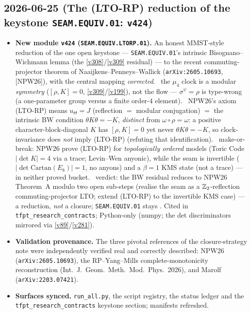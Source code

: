 \subsection*{2026-06-25 (The (LTO-RP) reduction of the keystone \texttt{SEAM.EQUIV.01}: \texttt{v424})}
\begin{itemize}
\item \textbf{New module \texttt{v424} (\texttt{SEAM.EQUIV.LTORP.01}).} An honest MMST-style reduction of the one
open keystone --- \texttt{SEAM.EQUIV.01}'s intrinsic Bisognano--Wichmann lemma (the \vref{v308}/\vref{v309}
residual) --- to the recent commuting-projector theorem of Naaijkens--Penneys--Wallick (\texttt{arXiv:2605.10693},
[NPW26]), with the central mapping \emph{corrected}. \mE\ the $\mu_4$ clock is a modular \emph{symmetry}
($[\rho,K]{=}0$, \vref{v309}/\vref{v199}), not the flow --- $\sigma^\psi{=}\rho$ is type-wrong (a one-parameter
group versus a finite order-$4$ element). \mE\ NPW26's axiom (LTO-RP) means $u_\Theta{=}J$ (reflection $=$ modular
conjugation) $=$ the intrinsic BW condition $\theta K\theta{=}-K$, \emph{distinct} from $\omega{\circ}\rho{=}\omega$:
a positive character-block-diagonal $K$ has $[\rho,K]{=}0$ yet never $\theta K\theta{=}-K$, so clock-invariance does
\emph{not} imply (LTO-RP) (refuting that identification). \mO\ make-or-break: NPW26 prove (LTO-RP) for
\emph{topologically ordered} models (Toric Code $|\det K|{=}4$ via a trace; Levin--Wen anyonic), while the seam is
invertible ($|\det\mathrm{Cartan}(E_8)|{=}1$, no anyons) and a $\beta{=}1$ KMS state (not a trace) --- in neither
proved bucket. \mC\ verdict: the BW residual reduces to NPW26 Theorem~A modulo two open sub-steps (realise the seam
as a $\mathbb{Z}_2$-reflection commuting-projector LTO; extend (LTO-RP) to the invertible KMS case) --- a reduction, \emph{not}
a closure; \texttt{SEAM.EQUIV.01} stays \mO. Cited in \texttt{tfpt\_research\_contracts}; Python-only (numpy; the det
discriminators mirrored via \vref{v89}/\vref{v281}).
\item \textbf{Validation provenance.} The three pivotal references of the closure-strategy note were independently
verified real and correctly described: NPW26 (\texttt{arXiv:2605.10693}), the RP--Yang--Mills complete-monotonicity
reconstruction (Int.\ J.\ Geom.\ Meth.\ Mod.\ Phys.\ 2026), and Marolf (\texttt{arXiv:2203.07421}).
\item \textbf{Surfaces synced.} \texttt{run\_all.py}, the script registry, the status ledger and the
\texttt{tfpt\_research\_contracts} keystone section; manifests refreshed.
\end{itemize}


